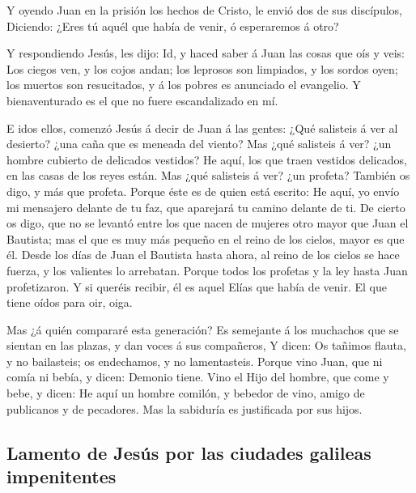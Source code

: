  Y oyendo Juan en la prisión los hechos de Cristo, le envió
dos de sus discípulos,  Diciendo: ¿Eres tú aquél que había
de venir, ó esperaremos á otro?

 Y respondiendo Jesús, les dijo: Id, y haced saber á Juan
las cosas que oís y veis:  Los ciegos ven, y los cojos
andan; los leprosos son limpiados, y los sordos oyen; los muertos son
resucitados, y á los pobres es anunciado el evangelio.  Y
bienaventurado es el que no fuere escandalizado en mí.

 E idos ellos, comenzó Jesús á decir de Juan á las gentes:
¿Qué salisteis á ver al desierto? ¿una caña que es meneada del viento?
 Mas ¿qué salisteis á ver? ¿un hombre cubierto de delicados
vestidos? He aquí, los que traen vestidos delicados, en las casas de los
reyes están.  Mas ¿qué salisteis á ver? ¿un profeta? También
os digo, y más que profeta.  Porque éste es de quien está
escrito: He aquí, yo envío mi mensajero delante de tu faz, que aparejará
tu camino delante de ti.  De cierto os digo, que no se
levantó entre los que nacen de mujeres otro mayor que Juan el Bautista;
mas el que es muy más pequeño en el reino de los cielos, mayor es que
él.  Desde los días de Juan el Bautista hasta ahora, al
reino de los cielos se hace fuerza, y los valientes lo arrebatan.
 Porque todos los profetas y la ley hasta Juan
profetizaron.  Y si queréis recibir, él es aquel Elías que
había de venir.  El que tiene oídos para oir, oiga.

 Mas ¿á quién compararé esta generación? Es semejante á los
muchachos que se sientan en las plazas, y dan voces á sus compañeros,
 Y dicen: Os tañimos flauta, y no bailasteis; os
endechamos, y no lamentasteis.  Porque vino Juan, que ni
comía ni bebía, y dicen: Demonio tiene.  Vino el Hijo del
hombre, que come y bebe, y dicen: He aquí un hombre comilón, y bebedor
de vino, amigo de publicanos y de pecadores. Mas la sabiduría es
justificada por sus hijos.

\hypertarget{lamento-de-jesuxfas-por-las-ciudades-galileas-impenitentes}{%
\subsection{Lamento de Jesús por las ciudades galileas
impenitentes}\label{lamento-de-jesuxfas-por-las-ciudades-galileas-impenitentes}}

